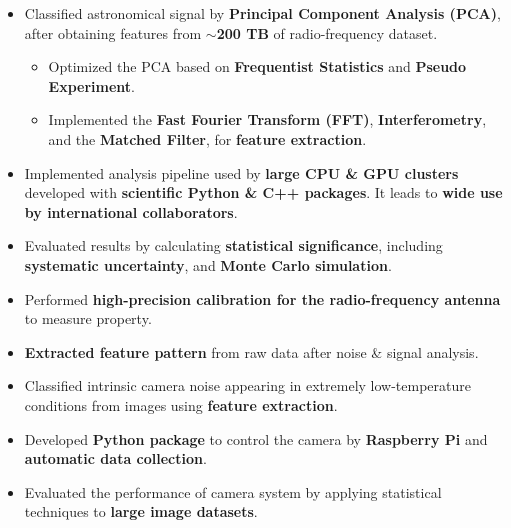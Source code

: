 \documentclass[10pt,a4paper,ragged2e,withhyper]{altacv}
\begin{document}
\begin{itemize}
\item Classified astronomical signal by {\bf Principal Component Analysis (PCA)}, after obtaining features from {\bf ${\sim}$200 TB} of radio-frequency dataset. 
\begin{itemize}
\item Optimized the PCA based on {\bf Frequentist Statistics} and {\bf Pseudo Experiment}.
\item Implemented the {\bf Fast Fourier Transform (FFT)}, {\bf Interferometry}, and the {\bf Matched Filter}, for {\bf feature extraction}.
\end{itemize}
\item Implemented analysis pipeline used by {\bf large CPU \& GPU clusters} developed with {\bf scientific Python \& C++ packages}. It leads to {\bf wide use by international collaborators}.
\item Evaluated results by calculating {\bf statistical significance}, including {\bf systematic uncertainty}, and {\bf Monte Carlo simulation}.
\end{itemize}
\begin{itemize}
\item Performed {\bf high-precision calibration for the radio-frequency antenna} to measure property.
\item {\bf Extracted feature pattern} from raw data after noise \& signal analysis.
\end{itemize}
\divider

\begin{itemize}
\item Classified intrinsic camera noise appearing in extremely low-temperature conditions from images using {\bf feature extraction}.
\item Developed {\bf Python package} to control the camera by {\bf Raspberry Pi} and {\bf automatic data collection}.
\item Evaluated the performance of camera system by applying statistical techniques to {\bf large image datasets}.
\end{itemize}
\end{document}
